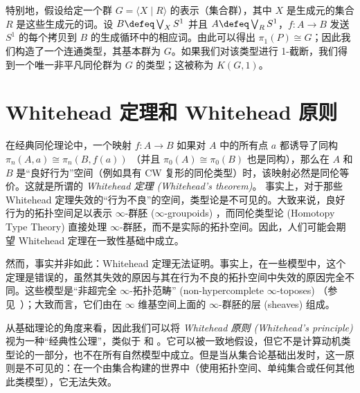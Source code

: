 {\begin{eg}\label{eg:kg1}
特别地，假设给定一个群 $G = \langle X \mid R \rangle$ 的表示（集合群），其中 $X$ 是生成元的集合 $R$ 是这些生成元的词。设 $B\defeq \bigvee_X S^1$ 并且 $A\defeq \bigvee_R S^1$，$f:A\to B$ 发送 $S^1$ 的每个拷贝到 $B$ 的生成循环中的相应词。由此可以得出 $\pi_1(P) \cong G$；因此我们构造了一个连通类型，其基本群为 $G$。如果我们对该类型进行 1-截断，我们得到一个唯一非平凡同伦群为 $G$ 的类型；这被称为 $K(G,1)$。%
%
\end{eg}

%

%
%

\section{Whitehead 定理和 Whitehead 原则}
\label{sec:whitehead}

在经典同伦理论中，一个映射 $f:A\to B$ 如果对 $A$ 中的所有点 $a$ 都诱导了同构 $\pi_n(A,a) \cong \pi_n(B,f(a))$ （并且 $\pi_0(A)\cong\pi_0(B)$ 也是同构），那么在 $A$ 和 $B$ 是“良好行为”空间（例如具有 CW 复形的同伦类型）时，该映射必然是同伦等价。这就是所谓的 \emph{Whitehead 定理 (Whitehead's theorem)}。
%
%
事实上，对于那些 Whitehead 定理失效的“行为不良”的空间，类型论是不可见的。大致来说，良好行为的拓扑空间足以表示 $\infty$-群胚 ($\infty$-groupoids)%
，而同伦类型论 (Homotopy Type Theory) 直接处理 $\infty$-群胚，而不是实际的拓扑空间。因此，人们可能会期望 Whitehead 定理在一致性基础中成立。

然而，事实并非如此：Whitehead 定理无法证明。事实上，在一些模型中，这个定理是错误的，虽然其失效的原因与其在行为不良的拓扑空间中失效的原因完全不同。这些模型是“非超完全 $\infty$-拓扑范畴” (non-hypercomplete $\infty$-toposes)
%
%
（参见~\cite{lurie:higher-topoi}）；大致而言，它们由在 $\infty$ 维基空间上面的 $\infty$-群胚的层 (sheaves) 组成。

%
%

从基础理论的角度来看，因此我们可以将 \emph{Whitehead 原则 (Whitehead's principle)} 视为一种“经典性公理”，类似于 \LEM{} 和 \choice{}。它可以被一致地假设，但它不是计算动机类型论的一部分，也不在所有自然模型中成立。但是当从集合论基础出发时，这一原则是不可见的：在一个由集合构建的世界中（使用拓扑空间、单纯集合或任何其他此类模型），它无法失效。

}
